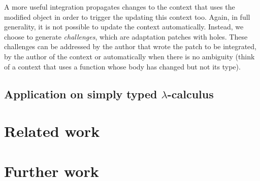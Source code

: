 \documentclass{article}
\newcommand{\remtext}[1]{}
\begin{document}
A more useful integration propagates changes to the context that uses
the modified object in order to trigger the updating this context
too. Again, in full generality, it is not possible to update the
context automatically. Instead, we choose to generate
\textit{challenges}, which are adaptation patches with holes. These
challenges can be addressed by the author that wrote the patch to be
integrated, by the author of the context or automatically when there
is no ambiguity (think of a context that uses a function whose
body has changed but not its type). 

\remtext{Fri Jun 18, 2010 1:42 PM. Si on se contente de concaténer
  $\Delta$ à $R$, on n'a intégré qu'une nouvelle version de l'objet
  initial~$t$ dans $R$ mais on n'a pas propagé ces modifications
  auprès des clients de $t$. Cette propagation n'est \textit{a priori}
  pas triviale~: rien ne dit que $t'$ à un sens équivalent à $t$. Il
  faut donc adapter les clients en demandant un patch d'adaptation à
  l'utilisateur. On présente ces demandes sous la forme de patch à
  compléter (on fournit un peu de contexte et on a un trou pour y
  injecter une nouvelle sous-dérivation mais on peut aussi modifier le
  contexte pour l'adapter). La construction d'un patch d'adaptation
  est un processus interactif~: on ne sait pas a priori borner le
  contexte nécessaire à la construction du patchs d'adaptation donc on
  peut imaginer un sorte de jeu où le système fait augmenter le
  contexte (en suivant les dépendances) si l'utilisateur ne sait pas
  construire le patch d'adaptation. En passant, quand on parle
  d'utilisateur ici, ce peut être aussi bien un programme, comme un
  type-checker pour le langage objet, ou bien un programmeur.}

\subsection{Application on simply typed $\lambda$-calculus}

\section{Related work}

\remtext{Dolphin, Twelf, etc}

\remtext{Semantic patches à la coccinnelle}

\section{Further work}
\end{document}
